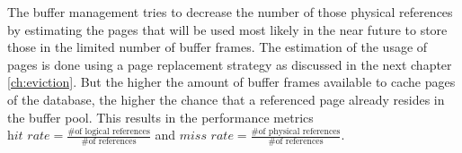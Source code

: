     The buffer management tries to decrease the number of those physical references by estimating the pages that will be used most likely in the near future to store those in the limited number of buffer frames. The estimation of the usage of pages is done using a page replacement strategy as discussed in the next chapter \ref{ch:eviction}. But the higher the amount of buffer frames available to cache pages of the database, the higher the chance that a referenced page already resides in the buffer pool. This results in the performance metrics $\textit{hit rate} = \frac{\text{\# of logical references}}{\text{\# of references}}$ and $\textit{miss rate} = \frac{\text{\# of physical references}}{\text{\# of references}}$.

\begin{@empty}



\end{@empty}
